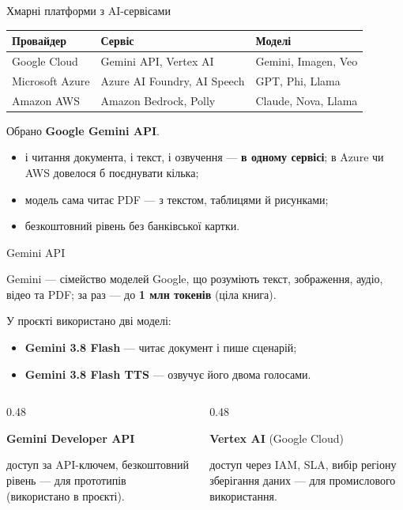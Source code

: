 \documentclass[aspectratio=43]{beamer}
\newcommand{\thesis}[1]{\begin{block}{}#1\end{block}}
\begin{document}
\begin{frame}{Хмарні платформи з AI-сервісами}
  \small
  \begin{tabular}{@{}lll@{}}
    \toprule
    Провайдер & Сервіс & Моделі \\
    \midrule
    Google Cloud & Gemini API, Vertex AI & Gemini, Imagen, Veo \\
    Microsoft Azure & Azure AI Foundry, AI Speech & GPT, Phi, Llama \\
    Amazon AWS & Amazon Bedrock, Polly & Claude, Nova, Llama \\
    \bottomrule
  \end{tabular}
  \normalsize

  \thesis{Обрано \textbf{Google Gemini API}.}
  \begin{itemize}
    \item і читання документа, і текст, і озвучення --- \textbf{в одному сервісі};
      в Azure чи AWS довелося б поєднувати кілька;
    \item модель сама читає PDF --- з текстом, таблицями й рисунками;
    \item безкоштовний рівень без банківської картки.
  \end{itemize}
\end{frame}

\begin{frame}{Gemini API}
  \thesis{Gemini --- сімейство моделей Google, що розуміють текст,
    зображення, аудіо, відео та PDF; за раз --- до \textbf{1 млн токенів}
    (ціла книга).}

  У проєкті використано дві моделі:
  \begin{itemize}
    \item \textbf{Gemini 3.8 Flash} --- читає документ і пише сценарій;
    \item \textbf{Gemini 3.8 Flash TTS} --- озвучує його двома голосами.
  \end{itemize}

  \begin{columns}[T]
    \begin{column}{0.48\textwidth}
      \thesis{\textbf{Gemini Developer API}}
      \small доступ за API-ключем, безкоштовний рівень --- для прототипів
      (використано в проєкті).
    \end{column}
    \begin{column}{0.48\textwidth}
      \thesis{\textbf{Vertex AI} (Google Cloud)}
      \small доступ через IAM, SLA, вибір регіону зберігання даних ---
      для промислового використання.
    \end{column}
  \end{columns}
\end{frame}
\end{document}
